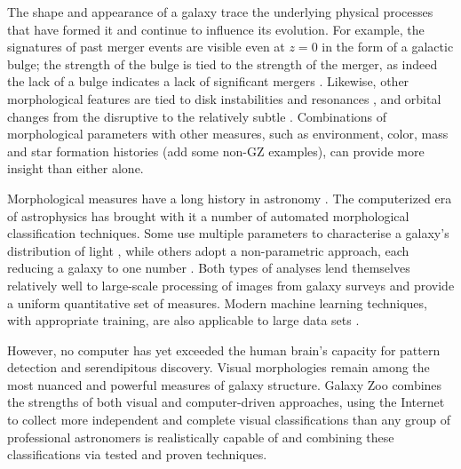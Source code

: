 \documentclass[useAMS,usenatbib]{mn2e}
\begin{document}
The shape and appearance of a galaxy trace the underlying physical processes that have formed it and continue to influence its evolution. For example, the signatures of past merger events \citep[from $z \sim 2$ onwards;][]{martig12} are visible even at $z = 0$ in the form of a galactic bulge; the strength of the bulge is tied to the strength of the merger, as indeed the lack of a bulge indicates a lack of significant mergers \citep[e.g.,][]{kormendy10}. Likewise, other morphological features are tied to disk instabilities and resonances \citep[e.g.,][]{kormendy04,b_elmegreen08,donghia13}, and orbital changes from the disruptive \citep[mergers; e.g.,][]{darg10b,darg10a,lotz08a,lotz08b} to the relatively subtle \citep[e.g., bars,][and for studies of visually-identified bars at $z > 0$ specifically, see e.g. \citeauthor{sheth08} \citeyear{sheth08}; \citeauthor{melvin14} \citeyear{melvin14}; \citeauthor{simmons14} \citeyear{simmons14}; \citeauthor{cheung15} \citeyear{cheung15}]{athanassoula92b,sellwood93,athanassoula05,athanassoula13}. Combinations of morphological parameters with other measures, such as environment, color, mass and star formation histories \citep[e.g.][]{bamford09,tojeiro07,schawinski14,smethurst15} (add some non-GZ examples), can provide more insight than either alone.

Morphological measures have a long history in astronomy \citep[e.g.,][]{hubble26,devaucouleurs,devaucouleurs59,sandage61,vandenbergh76,abraham96c,nair10}. The computerized era of astrophysics has brought with it a number of automated morphological classification techniques. Some use multiple parameters to characterise a galaxy's distribution of light \citep{sersic68,odewahn02}, while others adopt a non-parametric approach, each reducing a galaxy to one number \citep[and often used in combination; e.g.][]{abraham94, conselice03, lotz04a}. Both types of analyses lend themselves relatively well to large-scale processing of images from galaxy surveys \citep[e.g.][]{simard02,scarlata07,simard09,griffith12,lackner12,lackner13} and provide a uniform quantitative set of measures. Modern machine learning techniques, with appropriate training, are also applicable to large data sets \citep{huertascompany08,huertascompany15,dieleman15}.

However, no computer has yet exceeded the human brain's capacity for pattern detection and serendipitous discovery. Visual morphologies remain among the most nuanced and powerful measures of galaxy structure. Galaxy Zoo combines the strengths of both visual and computer-driven approaches, using the Internet to collect more independent and complete visual classifications than any group of professional astronomers is realistically capable of and combining these classifications via tested and proven techniques.
\end{document}
